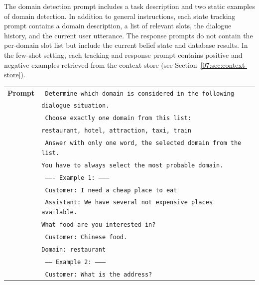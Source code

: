 The domain detection prompt includes a task description and two static examples of domain detection.
In addition to general instructions, each state tracking prompt contains a domain description, a list of relevant slots, the dialogue history, and the current user utterance.
The response prompts do not contain the per-domain slot list but include the current belief state and database results.
In the few-shot setting, each tracking and response prompt contains positive and negative examples retrieved from the context store (see Section~\ref{07:sec:context-store}).

\begin{table}[tp]
    \centering\small
    \begin{tabular}{rl}
      \toprule
      \textbf{Prompt} & \texttt{{\color{cyan!80!yellow!80!black!100 } Determine which domain is considered in the following}}\\
      & \texttt{{\color{cyan!80!yellow!80!black!100 }dialogue situation. }}\\
      & \texttt{ {\color{green!100!yellow!70!black!100 } Choose exactly one domain from this list:}}\\
      & \texttt{ {\color{green!100!yellow!70!black!100 }restaurant, hotel, attraction, taxi, train }} \\
      & \texttt{ {\color{cyan!80!yellow!80!black!100 } Answer with only one word, the selected domain from the list. }}\\
      & \texttt{ {\color{cyan!80!yellow!80!black!100 }You have to always select the most probable domain.}} \\
& \texttt{{\color{red!50!yellow!90!black!100!}  ------- Example 1: -------- }} \\
& \texttt{{\color{red!50!yellow!90!black!100!} Customer: I need a cheap place to eat}} \\
&\texttt{ {\color{red!50!yellow!90!black!100!} Assistant: We have several not expensive places available. }} \\
& \texttt{ {\color{red!50!yellow!90!black!100!}What food are you interested in?}} \\
& \texttt{{\color{red!50!yellow!90!black!100!} Customer: Chinese food.}} \\
& \texttt{{\color{red!50!yellow!90!black!100!}Domain: restaurant}} \\
& \texttt{{\color{red!50!yellow!90!black!100!} ------ Example 2: -------- } }\\
& \texttt{{\color{red!50!yellow!90!black!100!} Customer: What is the address?} } \\

\end{tabular}
\end{table}
